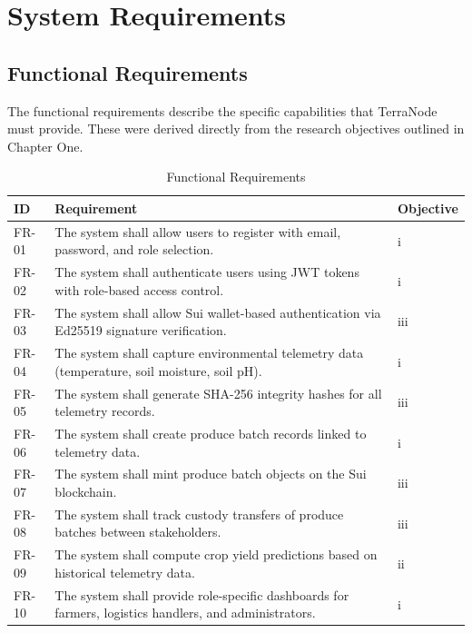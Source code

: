 \section{System Requirements}

\subsection{Functional Requirements}

The functional requirements describe the specific capabilities that TerraNode must provide. These were derived directly from the research objectives outlined in Chapter One.

\begin{table}[H]
\centering
\caption{Functional Requirements}
\label{tab:functional_req}
\begin{tabularx}{\textwidth}{|l|X|l|}
\hline
\textbf{ID} & \textbf{Requirement} & \textbf{Objective} \\
\hline
FR-01 & The system shall allow users to register with email, password, and role selection. & i \\
\hline
FR-02 & The system shall authenticate users using JWT tokens with role-based access control. & i \\
\hline
FR-03 & The system shall allow Sui wallet-based authentication via Ed25519 signature verification. & iii \\
\hline
FR-04 & The system shall capture environmental telemetry data (temperature, soil moisture, soil pH). & i \\
\hline
FR-05 & The system shall generate SHA-256 integrity hashes for all telemetry records. & iii \\
\hline
FR-06 & The system shall create produce batch records linked to telemetry data. & i \\
\hline
FR-07 & The system shall mint produce batch objects on the Sui blockchain. & iii \\
\hline
FR-08 & The system shall track custody transfers of produce batches between stakeholders. & iii \\
\hline
FR-09 & The system shall compute crop yield predictions based on historical telemetry data. & ii \\
\hline
FR-10 & The system shall provide role-specific dashboards for farmers, logistics handlers, and administrators. & i \\
\hline
\end{tabularx}
\end{table}

